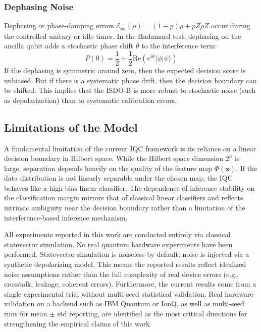 \documentclass[conference]{IEEEtran}
\begin{document}
\subsubsection{Dephasing Noise}
Dephasing or phase-damping errors $\mathcal{E}_{ph}(\rho) = (1-p)\rho + p Z\rho Z$ occur during the controlled unitary or idle times. In the Hadamard test, dephasing on the ancilla qubit adds a stochastic phase shift $\theta$ to the interference term:
\begin{equation}
    P(0) = \frac{1}{2} + \frac{1}{2} \text{Re}(e^{i\theta} \langle \phi | \psi \rangle)
\end{equation}
If the dephasing is symmetric around zero, then the expected decision score is unbiased. But if there is a systematic phase drift, then the decision boundary can be shifted. This implies that the ISDO-B is more robust to stochastic noise (such as depolarization) than to systematic calibration errors.

\subsection{Limitations of the Model}
A fundamental limitation of the current IQC framework is its reliance on a linear decision boundary in Hilbert space. While the Hilbert space dimension $2^n$ is large, separation depends heavily on the quality of the feature map $\Phi(\mathbf{x})$. If the data distribution is not linearly separable under the chosen map, the IQC behaves like a high-bias linear classifier. The dependence of inference stability on the classification margin mirrors that of classical linear classifiers and reflects intrinsic ambiguity near the decision boundary rather than a limitation of the interference-based inference mechanism.

All experiments reported in this work are conducted entirely via classical statevector simulation. No real quantum hardware experiments have been performed. Statevector simulation is noiseless by default; noise is injected via a synthetic depolarizing model. This means the reported results reflect idealized noise assumptions rather than the full complexity of real device errors (e.g., crosstalk, leakage, coherent errors). Furthermore, the current results come from a single experimental trial without multi-seed statistical validation. Real hardware validation on a backend such as IBM Quantum or IonQ, as well as multi-seed runs for mean $\pm$ std reporting, are identified as the most critical directions for strengthening the empirical claims of this work.
\end{document}
